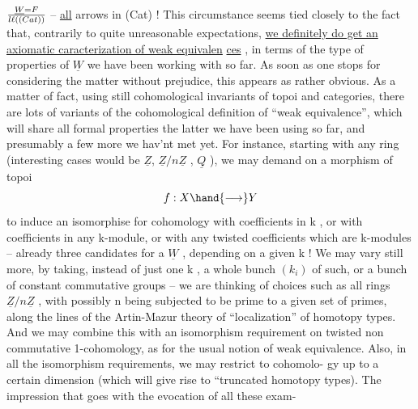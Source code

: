 
$\underline{W} = F\over{l}{\ell}((Cat))$ -- \uline{all} arrows in (Cat) ! This circumstance seems tied
closely to the fact that, contrarily to quite unreasonable expectations,
\uline{we definitely do  get an axiomatic caracterization of weak equivalen}%
\uline{ces} , in terms of the type of  properties of $\underline{W}$ we have
been working with so far. As soon as one stops for considering the matter
without prejudice, this appears as rather obvious. As a matter of fact,
using still cohomological invariants of topoi and categories, there are
lots of variants of the cohomological definition of ``weak equivalence'',
which will share all formal properties  the latter we have been using
so far, and presumably a few more we hav'nt met yet. For instance,
starting with any  ring  (interesting cases would be $\underline{Z}$,
$\underline{Z}/n\underline{Z}$ , $\underline{Q}$ ), we may demand on a morphism of topoi
\[ f: X \hand{\longrightarrow} Y \]
to induce an isomorphise for cohomology with coefficients in k , or
with coefficients in any k-module, or with any twisted coefficients which
are k-modules -- already three candidates for a $\underline{W}$ , depending on a
given k ! We may vary still more, by taking, instead of just one
k , a whole bunch $(k_{i})$ of such, or a bunch of \hand{(}constant\hand{)}  commutative
groups -- we  are thinking of choices such as all rings $\underline{Z}/n\underline{Z}$ , with
possibly n being subjected to be prime to a given set of primes, along
the lines of the Artin-Mazur theory of ``localization'' of homotopy types.
And we may combine this with an isomorphism requirement on twisted non
commutative 1-cohomology, as for the usual notion of weak equivalence.
Also, in all the isomorphism requirements, we may restrict to cohomolo-%
gy up to a certain dimension (which will give rise to ``truncated homotopy
types). The impression that goes with the evocation of all these exam-%
